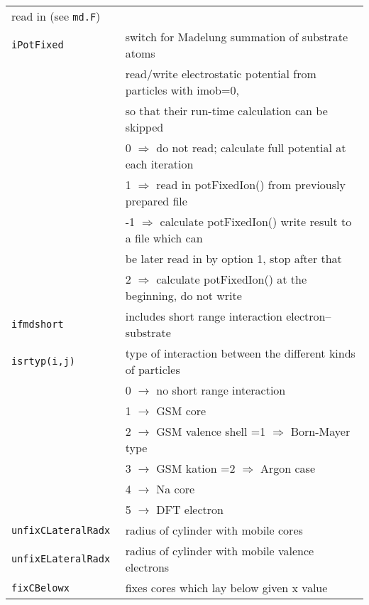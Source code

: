 \documentclass[12pt]{article}
\begin{document}
\begin{tabular}{ll}
                          read in (see {\tt md.F})\\
{\tt iPotFixed        }& switch for Madelung summation of substrate atoms\\
   & read/write electrostatic potential from particles with imob=0,\\
   &  so that their run-time calculation can be skipped\\
   &   0 $\Longrightarrow$ do not read; calculate full potential at each iteration\\
   &   1 $\Longrightarrow$ read in potFixedIon() from previously prepared file\\
   &  -1 $\Longrightarrow$ calculate potFixedIon() write result to a file which can\\
   &\qquad  be later read in by option 1, stop after that\\
   &   2 $\Longrightarrow$ calculate potFixedIon() at the beginning, do not write\\
{\tt ifmdshort} & includes short range interaction electron--substrate\\
{\tt isrtyp(i,j)      }& type of interaction between the different kinds of particles\\
{\tt                  }& 0   $\rightarrow$ no short range interaction\\
{\tt                  }& 1   $\rightarrow$ GSM core\\
{\tt                  }& 2   $\rightarrow$ GSM valence shell    =1 $\Longrightarrow$ Born-Mayer type\\
{\tt                  }& 3   $\rightarrow$ GSM kation                   =2 $\Longrightarrow$ Argon case\\
{\tt                  }& 4   $\rightarrow$ Na core\\
{\tt                  }& 5   $\rightarrow$ DFT electron\\
{\tt unfixCLateralRadx  }& radius of cylinder with mobile cores \\
{\tt unfixELateralRadx  }& radius of cylinder with mobile valence electrons\\
{\tt fixCBelowx       }&   fixes cores which lay below given x value\\
\hline
\end{tabular}
\end{document}
